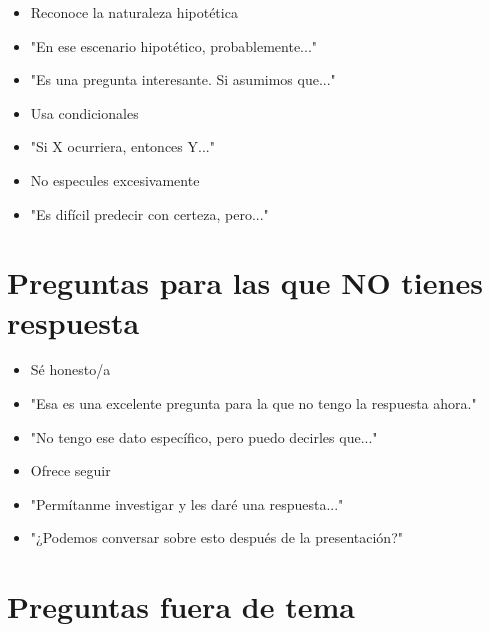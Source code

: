 \documentclass[a4paper,11pt]{article}
\begin{document}
\begin{itemize}

  \item Reconoce la naturaleza hipotética

  \item "En ese escenario hipotético, probablemente..."

  \item "Es una pregunta interesante. Si asumimos que..."

  \item Usa condicionales

  \item "Si X ocurriera, entonces Y..."

  \item No especules excesivamente

  \item "Es difícil predecir con certeza, pero..."

\end{itemize}

\vspace{0.2cm}

\section{Preguntas para las que NO tienes respuesta}

\begin{itemize}

  \item Sé honesto/a

  \item "Esa es una excelente pregunta para la que no tengo la respuesta ahora."

  \item "No tengo ese dato específico, pero puedo decirles que..."

  \item Ofrece seguir

  \item "Permítanme investigar y les daré una respuesta..."

  \item "¿Podemos conversar sobre esto después de la presentación?"

\end{itemize}

\vspace{0.2cm}

\section{Preguntas fuera de tema}
\end{document}
